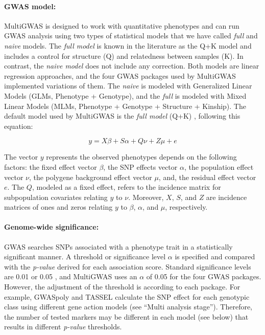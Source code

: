 \documentclass{article}
\begin{document}
\paragraph{GWAS model:}
MultiGWAS is designed to work with quantitative phenotypes and can run GWAS analysis using two types of statistical models that we have called \emph{full} and \emph{naive} models. The \emph{full model} is known in the literature as the Q+K model \cite{Yu2006} and includes a control for structure (Q) and relatedness between samples (K). In contrast, the \emph{naive model} does not include any correction. Both models are  
linear regression approaches, and the four GWAS packages used by MultiGWAS implemented variations of them. The \emph{naive} is modeled with Generalized Linear Models (GLMs, Phenotype + Genotype), and the \emph{full} is modeled with Mixed Linear Models (MLMs, Phenotype + Genotype + Structure + Kinship). The default model used by MultiGWAS is the \emph{full model} (Q+K) \cite{Yu2006}, following this equation:

\[
y=X\beta+S\alpha+Q\nu+Z\mu+e
\]

The vector $y$ represents the observed phenotypes depends on the following factors: the fixed effect vector $\beta$,  the SNP effects vector $\alpha$, the population effect vector $\nu$, the polygene background effect vector $\mu$, and, the residual effect vector $e$. The $Q$, modeled as a fixed effect, refers to the incidence matrix for subpopulation covariates relating $y$ to $\nu$. Moreover, $X$, $S$, and $Z$ are incidence matrices of ones and zeros relating $y$ to $\beta$, $\alpha$, and $\mu$, respectively.

\paragraph{Genome-wide significance: }
GWAS searches SNPs associated with a phenotype trait in a statistically significant manner. A threshold or significance level $\alpha$ is specified and compared with the \emph{p-value} derived for each association score. Standard significance levels are 0.01 or 0.05 \cite{Gumpinger2018,Rosyara2016}, and MultiGWAS uses an $\alpha$ of 0.05 for the four GWAS packages. However, the adjustment of the threshold is according to each package. For example, GWASpoly and TASSEL calculate the SNP effect for each genotypic class using different gene action models (see ``Multi analysis stage''). Therefore, the number of tested markers\emph{ }may be different in each model (see below) that results in different \emph{p-value} thresholds.
\end{document}
